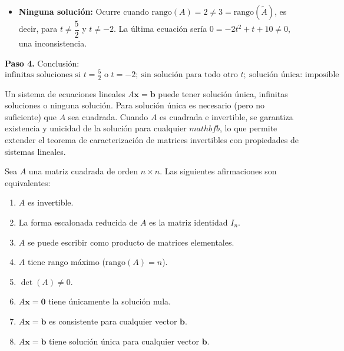 \begin{example}
\begin{myproof}
\begin{itemize}
\item \textbf{Ninguna solución:} Ocurre cuando \(\text{rango}(A) = 2 \neq 3 = \text{rango}(\tilde{A})\), es decir, para \(t \neq \dfrac{5}{2}\) y \(t \neq -2\). La última ecuación sería \(0 = -2t^2 + t + 10 \neq 0\), una inconsistencia.
\end{itemize}

\textbf{Paso 4.} Conclusión:
\[
\boxed{\text{infinitas soluciones si } t = \tfrac{5}{2} \text{ o } t = -2;\ \text{sin solución para todo otro } t;\ \text{solución única: imposible}}
\]
\end{myproof}
\end{example}

\begin{rem} 
Un sistema de ecuaciones lineales $A\mathbf{x}=\mathbf{b}$ puede tener solución única, infinitas soluciones o ninguna solución. Para solución única es necesario (pero no suficiente) que $A$ sea cuadrada. Cuando $A$ es cuadrada e invertible, se garantiza existencia y unicidad de la solución para cualquier $mathbf{b}$, lo que permite extender el teorema de caracterización de matrices invertibles con propiedades de sistemas lineales.
\end{rem}

\begin{theorem}\label{thm:invertible-equiv-v3}
Sea $A$ una matriz cuadrada de orden $n \times n$. Las siguientes afirmaciones son equivalentes:
\begin{enumerate}
    \item $A$ es invertible.
    \item La forma escalonada reducida de $A$ es la matriz identidad $I_n$.
    \item $A$ se puede escribir como producto de matrices elementales.
    \item $A$ tiene rango máximo ($\text{rango}(A) = n$).
    \item $\det(A) \neq 0$.
    \item $A\mathbf{x}=\mathbf{0}$ tiene únicamente la solución nula.
    \item $A\mathbf{x}=\mathbf{b}$ es consistente para cualquier vector $\mathbf{b}$.
    \item $A\mathbf{x}=\mathbf{b}$ tiene solución única para cualquier vector $\mathbf{b}$.
\end{enumerate}
\end{theorem}

